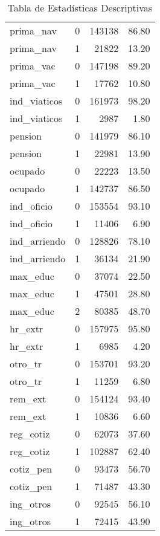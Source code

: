 \begin{table}[ht]
\begin{tabular}{lrrr}
  prima\_nav &   0 & 143138 & 86.80 \\ 
  prima\_nav &   1 & 21822 & 13.20 \\ 
  prima\_vac &   0 & 147198 & 89.20 \\ 
  prima\_vac &   1 & 17762 & 10.80 \\ 
  ind\_viaticos &   0 & 161973 & 98.20 \\ 
  ind\_viaticos &   1 & 2987 & 1.80 \\ 
  pension &   0 & 141979 & 86.10 \\ 
  pension &   1 & 22981 & 13.90 \\ 
  ocupado &   0 & 22223 & 13.50 \\ 
  ocupado &   1 & 142737 & 86.50 \\ 
  ind\_oficio &   0 & 153554 & 93.10 \\ 
  ind\_oficio &   1 & 11406 & 6.90 \\ 
  ind\_arriendo &   0 & 128826 & 78.10 \\ 
  ind\_arriendo &   1 & 36134 & 21.90 \\ 
  max\_educ &   0 & 37074 & 22.50 \\ 
  max\_educ &   1 & 47501 & 28.80 \\ 
  max\_educ &   2 & 80385 & 48.70 \\ 
  hr\_extr &   0 & 157975 & 95.80 \\ 
  hr\_extr &   1 & 6985 & 4.20 \\ 
  otro\_tr &   0 & 153701 & 93.20 \\ 
  otro\_tr &   1 & 11259 & 6.80 \\ 
  rem\_ext &   0 & 154124 & 93.40 \\ 
  rem\_ext &   1 & 10836 & 6.60 \\ 
  reg\_cotiz &   0 & 62073 & 37.60 \\ 
  reg\_cotiz &   1 & 102887 & 62.40 \\ 
  cotiz\_pen &   0 & 93473 & 56.70 \\ 
  cotiz\_pen &   1 & 71487 & 43.30 \\ 
  ing\_otros &   0 & 92545 & 56.10 \\ 
  ing\_otros &   1 & 72415 & 43.90 \\ 
   \bottomrule
\end{tabular}
\caption{Tabla de Estadísticas Descriptivas} 
\label{tab:descriptiva}
\end{table}
